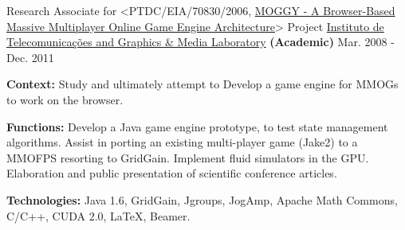 \begin{cventries}
  \cventry
    {Research Associate for <PTDC/EIA/70830/2006, \href{http://www.di.ubi.pt/~agomes/moggy/index.html}{MOGGY - A Browser-Based Massive Multiplayer Online Game Engine Architecture}> Project} %
    {\href{http://www.it.ubi.pt/medialab}{Instituto de Telecomunica\c{c}\~{o}es and Graphics \& Media Laboratory} \textbf{(Academic)}} %
    {} %
    {Mar. 2008 - Dec. 2011} %
    {
      \begin{cvitems} %
		\item {\textbf{Context:} Study and ultimately attempt to Develop a game engine for MMOGs to work on the browser.}
		\item {\textbf{Functions:} Develop a Java game engine prototype, to test state management algorithms. Assist in porting an existing multi-player game (Jake2) to a MMOFPS resorting to GridGain. Implement fluid simulators in the GPU. Elaboration and public presentation of scientific conference articles.}
		\item {\textbf{Technologies:} Java 1.6, GridGain, Jgroups, JogAmp, Apache Math Commons, C/C++, CUDA 2.0, LaTeX,  Beamer.} %
      \end{cvitems}
    }     
    

\end{cventries}
